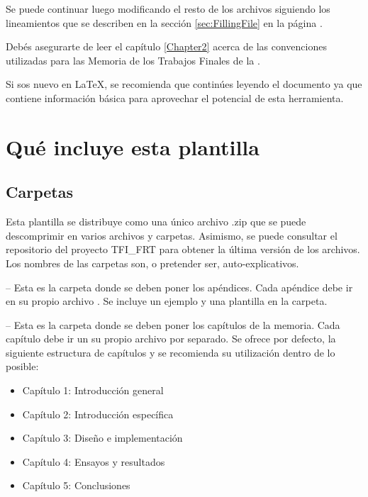 Se puede continuar luego modificando el resto de los archivos siguiendo los lineamientos que se describen en la sección \ref{sec:FillingFile} en la página \pageref{sec:FillingFile}.

Debés asegurarte de leer el capítulo \ref{Chapter2} acerca de las convenciones utilizadas para las Memoria de los Trabajos Finales de la \degreename.

Si sos nuevo en \LaTeX{}, se recomienda que continúes leyendo el documento ya que contiene información básica para aprovechar el potencial de esta herramienta.



\section{Qué incluye esta plantilla}

\subsection{Carpetas}

Esta plantilla se distribuye como una único archivo .zip que se puede descomprimir en varios archivos y carpetas. Asimismo, se puede consultar el repositorio del proyecto TFI\_FRT para obtener la última versión de los archivos. Los nombres de las carpetas son, o pretender ser, auto-explicativos.

 -- Esta es la carpeta donde se deben poner los apéndices. Cada apéndice debe ir en su propio archivo . Se incluye un ejemplo y una plantilla en la carpeta.

 -- Esta es la carpeta donde se deben poner los capítulos de la memoria. Cada capítulo debe ir un su propio archivo  por separado.  Se ofrece por defecto, la siguiente estructura de capítulos y se recomienda su utilización dentro de lo posible:

\begin{itemize}
\item Capítulo 1: Introducción general	
\item Capítulo 2: Introducción específica
\item Capítulo 3: Diseño e implementación
\item Capítulo 4: Ensayos y resultados
\item Capítulo 5: Conclusiones

\end{itemize}

